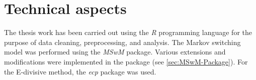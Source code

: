 \section{Technical aspects}

The thesis work has been carried out using the \emph{R} programming
language for the purpose of data cleaning, preprocessing, and analysis.
The Markov switching model was performed using the \emph{MSwM} package.
Various extensions and modifications were implemented in the package
(see \ref{sec:MSwM-Package}). For the E-divisive method, the \emph{ecp}
package was used. 


